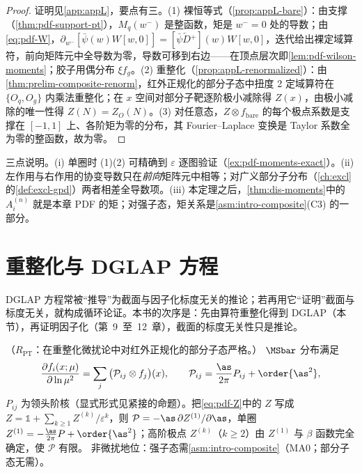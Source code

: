 \begin{proof}
证明见\cref{app:appL}，要点有三。(1) 裸恒等式（\cref{prop:appL-bare}）：由支撑（\cref{thm:pdf-support-pt}），$M_q(w^-)$ 是整函数，矩是 $w^-=0$ 处的导数；由\cref{eq:pdf-W}，$\partial_{w^-}[\bar\psi(w)W[w,0]]=[\bar\psi\overleftarrow{D}{}^+](w)W[w,0]$，迭代给出裸定域算符，前向矩阵元中全导数为零，导数可移到右边——在顶点层次即\cref{lem:pdf-wilson-moments}；胶子用偶分布 $\xi f_g$。(2) 重整化（\cref{prop:appL-renormalized}）：由\cref{thm:prelim-composite-renorm}，红外正规化的部分子态中扭度 2 定域算符在 $\{O_q,O_g\}$ 内乘法重整化；在 $x$ 空间对部分子靶逐阶极小减除得 $Z(x)$，由极小减除的唯一性得 $Z(N)=Z_O(N)$。(3) 对任意态，$Z\otimes f_{\mathrm{bare}}$ 的每个极点系数是支撑在 $[-1,1]$ 上、各阶矩为零的分布，其 Fourier--Laplace 变换是 Taylor 系数全为零的整函数，故为零。
\end{proof}

三点说明。(i) 单圈时 (1)(2) 可精确到 $\varepsilon$ 逐图验证（\cref{ex:pdf-moments-exact}）。(ii) 左作用与右作用的协变导数只在\emph{前向}矩阵元中相等；对广义部分子分布（\cref{ch:excl}的\cref{def:excl-gpd}）两者相差全导数项。(iii) 本定理之后，\cref{thm:dis-moments}中的 $A^{(n)}_i$ 就是本章 PDF 的矩；对强子态，矩关系是\cref{asm:intro-composite}(C3) 的一部分。

\section{重整化与 DGLAP 方程}\label{sec:pdf-dglap}

DGLAP 方程常被“推导”为截面与因子化标度无关的推论；若再用它“证明”截面与标度无关，就构成循环论证。本书的次序是：先由算符重整化得到 DGLAP（本节），再证明因子化（第~9~至~12~章），截面的标度无关性只是推论。


\begin{theorem}\label{thm:pdf-dglap}
（$R_{\mathrm{PT}}$：在重整化微扰论中对红外正规化的部分子态严格。）
$\MSbar$ 分布满足
\begin{equation}\label{eq:pdf-dglap}
\frac{\partial f_i(x;\mu)}{\partial\ln\mu^2}=\sum_j\big(\mathcal P_{ij}\otimes f_j\big)(x),\qquad
\mathcal P_{ij}=\frac{\as}{2\pi}P_{ij}+\order{\as^2},
\end{equation}
$P_{ij}$ 为领头阶核（显式形式见紧接的命题）。把\cref{eq:pdf-Z}中的 $Z$ 写成 $Z=\mathbb 1+\sum_{k\ge1}Z^{(k)}/\varepsilon^k$，则 $\mathcal P=-\as\,\partial Z^{(1)}/\partial\as$，单圈 $Z^{(1)}=-\frac{\as}{2\pi}P+\order{\as^2}$；高阶极点 $Z^{(k)}$（$k\ge2$）由 $Z^{(1)}$ 与 $\beta$ 函数完全确定，使 $\mathcal P$ 有限。
非微扰地位：强子态需\cref{asm:intro-composite}（MA0；部分子态无需）。
\end{theorem}

